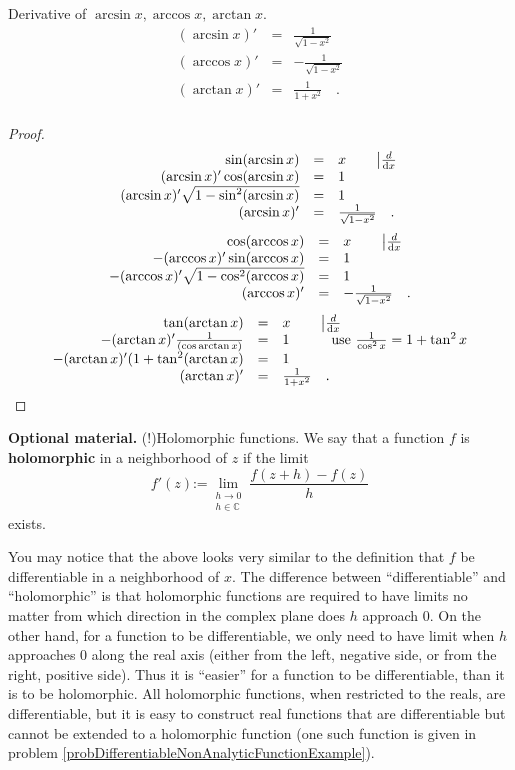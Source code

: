 \documentclass[12pt]{book}
\newcommand{\eqdef}{\textbf{:=}}
\renewcommand{\emph}{\textbf}
\begin{document}
Derivative of $\arcsin x, \arccos x, \arctan x$.
\[
\begin{array}{rcl}
(\arcsin x)'&=&\frac{1}{\sqrt{1-x^2}} \\
(\arccos x)'&=&-\frac{1}{\sqrt{1-x^2}}\\
(\arctan x)'&=&\frac{1}{1+x^2}\quad .\\
\end{array}
\]
\begin{proof}
\[
\begin{array}{rcl}
\sin(\arcsin x)&=& x  \quad\quad\left|\frac{d}{{\normalfont \text{d}} x}\right. \\
(\arcsin x)'\cos (\arcsin x) &=& 1\\
(\arcsin x)'\sqrt{1-\sin^2(\arcsin x) } &=& 1\\
(\arcsin x)' &=&\frac{1}{\sqrt{1-x^2}}\quad .
\end{array}
\]
\[
\begin{array}{rcl}
\cos(\arccos x)&=& x \quad\quad\left|\frac{d}{{\normalfont \text{d}} x}\right. \\
-(\arccos x)'\sin (\arccos x) &=& 1\\
-(\arccos x)'\sqrt{1-\cos^2(\arccos x) } &=& 1\\
(\arccos x)' &=&-\frac{1}{\sqrt{1-x^2}}\quad .
\end{array}
\]
\[
\begin{array}{rcl}
\tan(\arctan x)&=& x \quad\quad\left|\frac{d}{{\normalfont \text{d}} x}\right. \\
-(\arctan x)'\frac{1}{ (\cos{\arctan x})} &=& 1 \quad \quad \quad \mathrm{use~} \frac{1}{\cos^2x}= 1+\tan^2x\\
-(\arctan x)'(1+\tan^2(\arctan x) &=& 1\\
(\arctan x)' &=&\frac{1}{1+x^2}\quad .
\end{array}
\]

\end{proof}


\textbf{Optional material.} (!)Holomorphic functions. We say that a function $f$ is \emph{holomorphic} in a neighborhood of  $z$ if the limit
\[
f'(z)\eqdef \lim_{\substack{h\to 0\\ h\in \mathbb C}} \frac{ f(z+h)-f(z)}{h}
\]
exists.

You may notice that the above looks very similar to the definition that $f$ be differentiable in a neighborhood of $x$. The difference between ``differentiable'' and ``holomorphic'' is that holomorphic functions are required to have limits no matter from which direction in the complex plane does $h$ approach $0$. On the other hand, for a function to be differentiable, we only need to have limit when $h$ approaches $0$ along the real axis (either from the left, negative side, or from the right, positive side). Thus it is ``easier'' for a function to be differentiable, than it is to be holomorphic. All holomorphic functions, when restricted to the reals, are differentiable, but it is easy to construct real functions that are differentiable but cannot be extended to a holomorphic function (one such function is given in problem \ref{probDifferentiableNonAnalyticFunctionExample}).
\end{document}
